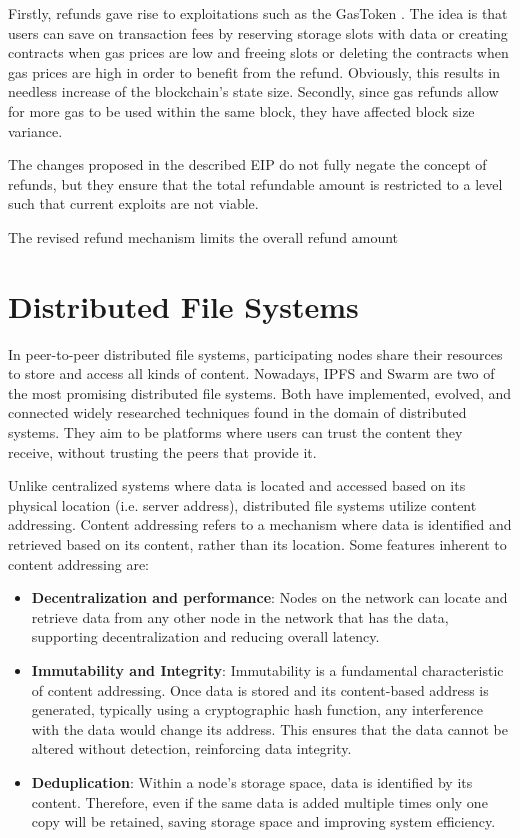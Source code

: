 Firstly, refunds gave rise to exploitations such as the GasToken \citep{gastokenproject_2018}. The idea is that users can save on transaction fees by reserving storage slots with data or creating contracts when gas prices are low and freeing slots or deleting the contracts when gas prices are high in order to benefit from the refund. Obviously, this results in needless increase of the blockchain's state size. Secondly, since gas refunds allow for more gas to be used within the same block, they have affected block size variance.

The changes proposed in the described EIP do not fully negate the concept of refunds, but they ensure that the total refundable amount is restricted to a level such that current exploits are not viable.

The revised refund mechanism limits the overall refund amount
\section{Distributed File Systems}\label{sec:dfs}
In peer-to-peer distributed file systems, participating nodes share their resources to store and access all kinds of content. Nowadays, IPFS and Swarm are two of the most promising distributed file systems. Both have implemented, evolved, and connected widely researched techniques found in the domain of distributed systems. They aim to be platforms where users can trust the content they receive, without trusting the peers that provide it.

Unlike centralized systems where data is located and accessed based on its physical location (i.e. server address), distributed file systems utilize content addressing. Content addressing \citep{trautwein_2022} refers to a mechanism where data is identified and retrieved based on its content, rather than its location. Some features inherent to content addressing are:

\begin{itemize}
    \item \textbf{Decentralization and performance}: Nodes on the network can locate and retrieve data from any other node in the network that has the data, supporting decentralization and reducing overall latency.
    \item \textbf{Immutability and Integrity}: Immutability is a fundamental characteristic of content addressing. Once data is stored and its content-based address is generated, typically using a cryptographic hash function, any interference with the data would change its address. This ensures that the data cannot be altered without detection, reinforcing data integrity.
    \item \textbf{Deduplication}: Within a node's storage space, data is identified by its content. Therefore, even if the same data is added multiple times only one copy will be retained, saving storage space and improving system efficiency.
\end{itemize}


